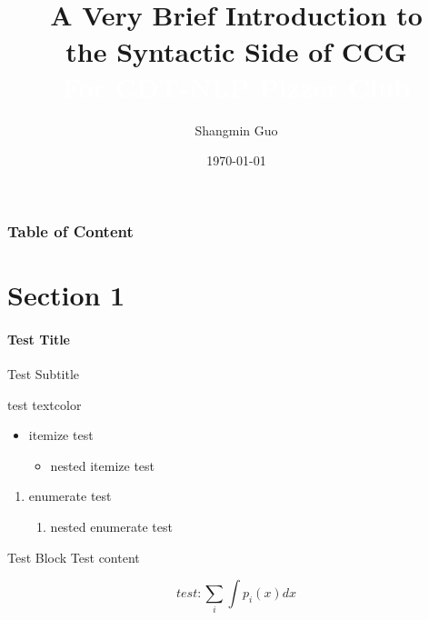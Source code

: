 \documentclass[mathserif,xcolor=dvipsnames,svgnames,aspectratio=43,compress]{beamer}
\begin{document}
\title{\\\medskip \textbf{\LARGE{A Very Brief Introduction to \\ the Syntactic Side of CCG}}  %
    \\\medskip
    \Large\textcolor{white}{For CDT-NLP Pizzer Club}}
    
\author{\large{Shangmin Guo}}
\date[\today]{\today} %

\begin{frame}
    \titlepage
\end{frame}

\begin{frame}[t]
    \frametitle{Table of Content}
    \tableofcontents
\end{frame}

\section{Section 1}

\begin{frame}[t]
    \framesubtitle{Test Title}{Test Subtitle}

    test textcolor

    \begin{itemize}
        \item itemize test
        \begin{itemize}
            \item nested itemize test
        \end{itemize}
    \end{itemize}

    \begin{enumerate}
        \item enumerate test
        \begin{enumerate}
            \item nested enumerate test
        \end{enumerate}
    \end{enumerate}

    \begin{block}{Test Block}
        Test content
    \end{block}

    \begin{equation}
        test: \sum_{i} \int p_i(x)dx
    \end{equation}

\end{frame}
\end{document}
